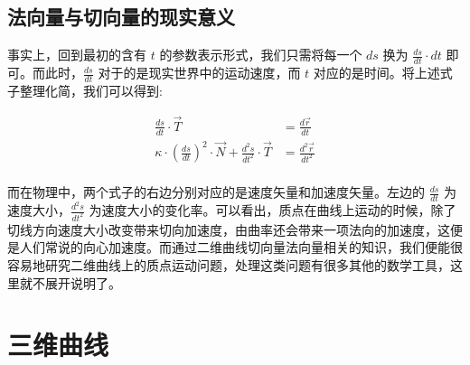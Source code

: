 \documentclass[fontset=windows]{article}
\begin{document}



\subsection{法向量与切向量的现实意义}

事实上，回到最初的含有 $t$ 的参数表示形式，我们只需将每一个 $ds$ 换为 $\frac{ds}{dt} \cdot dt$ 即可。而此时，$\frac{ds}{dt}$ 对于的是现实世界中的运动速度，而 $t$ 对应的是时间。将上述式子整理化简，我们可以得到:

$$
\begin{aligned}
\frac{ds}{dt}\cdot\vec{T} &= \frac{d\vec{r}}{dt} \\
\kappa \cdot (\frac{ds}{dt}) ^ 2 \cdot \vec{N} + \frac{d^2s}{dt^2}\cdot\vec{T} &= \frac{d^2\vec{r}}{dt^2}  \\
\end{aligned}
$$

而在物理中，两个式子的右边分别对应的是速度矢量和加速度矢量。左边的 $\frac{ds}{dt}$ 为速度大小，$\frac{d^2s}{dt^2}$ 为速度大小的变化率。可以看出，质点在曲线上运动的时候，除了切线方向速度大小改变带来切向加速度，由曲率还会带来一项法向的加速度，这便是人们常说的向心加速度。而通过二维曲线切向量法向量相关的知识，我们便能很容易地研究二维曲线上的质点运动问题，处理这类问题有很多其他的数学工具，这里就不展开说明了。

\section{三维曲线}
\end{document}
